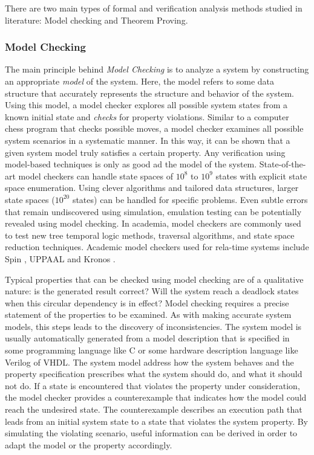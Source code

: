 There are two main types of formal and verification analysis methods studied in literature: Model checking and Theorem Proving.

\subsubsection{Model Checking}


The main principle behind \emph{Model Checking} is to analyze a system by constructing an appropriate \emph{model} of the system. Here, the model refers to some data structure that accurately represents the structure and behavior of the system. Using this model, a model checker explores all possible system states from a known initial state and \emph{checks} for property violations. Similar to a computer chess program that checks possible moves, a model checker examines all possible system scenarios in a systematic manner. In this way, it can be shown that a given system model truly satisfies a certain property. Any verification using model-based techniques is only as good ad the model of the system. State-of-the-art model checkers can handle state spaces of $10^8$ to $10^9$ states with explicit state space enumeration. Using clever algorithms and tailored data structures, larger state spaces ($10^{20}$ states) can be handled for specific problems. Even subtle errors that remain undiscovered using simulation, emulation testing can be potentially revealed using model checking. In academia, model checkers are commonly used to test new tree temporal logic methods, traversal algorithms, and state space reduction techniques. Academic model checkers used for rela-time systems include Spin \cite{holzmann2004spin}, UPPAAL \cite{larsen1997uppaal} and Kronos \cite{yovine1997kronos}. 

Typical properties that can be checked using model checking are of a qualitative nature: is the generated result correct? Will the system reach a deadlock states when this circular dependency is in effect? Model checking requires a precise statement of the properties to be examined. As with making accurate system models, this steps leads to the discovery of inconsistencies. The system model is usually automatically generated from a model description that is specified in some programming language like C or some hardware description language like Verilog of VHDL. The system model address how the system behaves and the property specification prescribes what the system should do, and what it should not do. If a state is encountered that violates the property under consideration, the model checker provides a counterexample that indicates how the model could reach the undesired state. The counterexample describes an execution path that leads from an initial system state to a state that violates the system property. By simulating the violating scenario, useful information can be derived in order to adapt the model or the property accordingly. 

